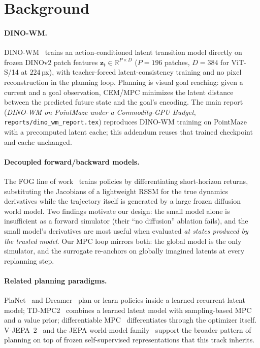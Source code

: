 \documentclass[11pt,a4paper]{article}
\newcommand{\zlat}{\mathbf{z}}
\begin{document}
\section{Background}
\label{sec:background}

\paragraph{DINO-WM.} DINO-WM~\cite{dinowm2025} trains an action-conditioned
latent transition model directly on frozen DINOv2 patch features
$\zlat_t \in \mathbb{R}^{P\times D}$ ($P{=}196$ patches, $D{=}384$ for
ViT-S/14 at $224$\,px), with teacher-forced latent-consistency training and no
pixel reconstruction in the planning loop. Planning is visual goal reaching:
given a current and a goal observation, CEM/MPC minimizes the latent distance
between the predicted future state and the goal's encoding. The main report
(\emph{DINO-WM on PointMaze under a Commodity-GPU Budget},
\texttt{reports/dino\_wm\_report.tex}) reproduces DINO-WM training on PointMaze
with a precomputed latent cache; this addendum reuses that trained checkpoint
and cache unchanged.

\paragraph{Decoupled forward/backward models.} The FOG line of
work~\cite{fog2026} trains policies by differentiating short-horizon returns,
substituting the Jacobians of a lightweight RSSM for the true dynamics
derivatives while the trajectory itself is generated by a large frozen
diffusion world model. Two findings motivate our design: the small model alone
is insufficient as a forward simulator (their ``no diffusion'' ablation
fails), and the small model's derivatives are most useful when evaluated
\emph{at states produced by the trusted model}. Our MPC loop mirrors both: the
global model is the only simulator, and the surrogate re-anchors on globally
imagined latents at every replanning step.

\paragraph{Related planning paradigms.} PlaNet~\cite{planet} and
Dreamer~\cite{dreamer} plan or learn policies inside a learned recurrent
latent model; TD-MPC2~\cite{tdmpc2} combines a learned latent model with
sampling-based MPC and a value prior; differentiable MPC~\cite{diffmpc}
differentiates through the optimizer itself. V-JEPA~2~\cite{vjepa2} and the
JEPA world-model family~\cite{jepawm} support the broader pattern of planning
on top of frozen self-supervised representations that this track inherits.
\end{document}
